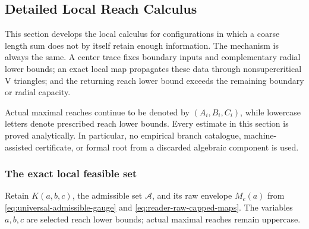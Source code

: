 \subsection{Detailed Local Reach Calculus}
\label{sec:exact-local-demand-calculus}
\label{sec:admissible-set-derivation}

This section develops the local calculus for configurations in which a coarse
length sum does not by itself retain enough information.  The mechanism is
always the same.  A center trace fixes boundary inputs and complementary
radial lower bounds; an exact
local map propagates these data through nonsupercritical V triangles; and the
returning reach lower bound exceeds the remaining boundary or radial capacity.

Actual maximal reaches continue to be denoted by $(A_i,B_i,C_i)$, while
lowercase letters denote prescribed reach lower bounds.  Every estimate in this section
is proved analytically.  In particular, no empirical branch catalogue,
machine-assisted certificate, or formal root from a discarded algebraic
component is used.

\subsubsection{The exact local feasible set}

Retain $K(a,b,c)$, the admissible set $\mathcal A$, and its raw envelope
$M_c(a)$ from \eqref{eq:universal-admissible-gauge} and
\eqref{eq:reader-raw-capped-maps}. The variables $a,b,c$ are selected reach
lower bounds; actual maximal reaches remain uppercase.

